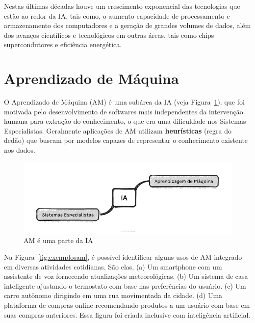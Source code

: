 \documentclass[a4paper,12pt]{book}
\begin{document}
	Nestas últimas décadas houve um crescimento exponencial das tecnologias que  estão ao redor da IA, tais como, o aumento capacidade de processamento e armazenamento dos computadores e a geração de grandes volumes de dados, além dos avanços científicos e tecnológicos em outras áreas, tais como chips supercondutores e eficiência energética.
	
	\section{Aprendizado de Máquina}
	
	O Aprendizado de Máquina (AM) é uma subárea da IA (veja Figura~\ref{fig:iaam}). que foi motivada pelo desenvolvimento de softwares mais independentes da intervenção humana para extração do conhecimento, o que era uma dificuldade nos Sistemas Especialistas. Geralmente aplicações de AM utilizam \textbf{heurísticas} (regra do dedão) que buscam por modelos capazes de representar o conhecimento existente nos dados. 
	
	
	\begin{figure}[h]
		\centering
		\includegraphics[width=0.9\linewidth]{figuras/ia.png}
		\caption{AM é uma parte da IA}
		\label{fig:iaam}
	\end{figure}
	
	Na Figura~\ref{fig:exemplosam}, é possível identificar alguns usos de AM integrado em diversas atividades cotidianas. São elas, (a) Um smartphone com um assistente de voz fornecendo atualizações meteorológicas. (b) Um sistema de casa inteligente ajustando o termostato com base nas preferências do usuário. (c) Um carro autônomo dirigindo em uma rua movimentada da cidade. (d) Uma plataforma de compras online recomendando produtos a um usuário com base em suas compras anteriores. Essa figura foi criada inclusive com inteligência artificial.
	
\end{document}
